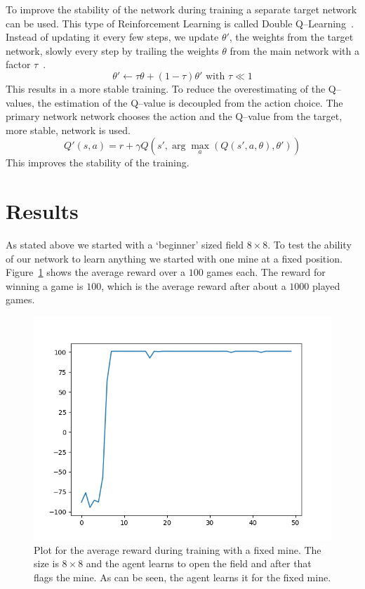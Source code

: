 To improve the stability of the network during training a separate target network can be used.
This type of Reinforcement Learning is called Double Q--Learning~\cite{HasseltGS15}.
Instead of updating it every few steps, we update $\theta'$, the weights from the target network, slowly every step by trailing the weights $\theta$ from the main network with a factor $\tau$~\cite{lillicrap2015continuous}.
\begin{equation}
	\theta' \leftarrow \tau\theta + (1-\tau)\theta' \text{ with } \tau \ll 1
\end{equation}
This results in a more stable training.
To reduce the overestimating of the Q--values, the estimation of the Q--value is decoupled from the action choice.
The primary network network chooses the action and the Q--value from the target, more stable, network is used.
\begin{equation}
	Q'(s, a) = r + \gamma Q(s', \arg\max_a(Q(s', a, \theta), \theta')) 
\end{equation}
This improves the stability of the training.

\section{Results}
As stated above we started with a `beginner' sized field $8 \times 8$.
To test the ability of our network to learn anything we started with one mine at a fixed position.
Figure~\ref{fig:fixed_mine} shows the average reward over a $100$ games each.
The reward for winning a game is $100$, which is the average reward after about a $1000$ played games.

\begin{figure}
	\centering
	\includegraphics[width=\textwidth]{images/fixed_mine_position.png}
	\caption{Plot for the average reward during training with a fixed mine. The size is $8 \times 8$ and the agent learns to open the field and after that flags the mine. As can be seen, the agent learns it for the fixed mine.}
	\label{fig:fixed_mine}
\end{figure}

